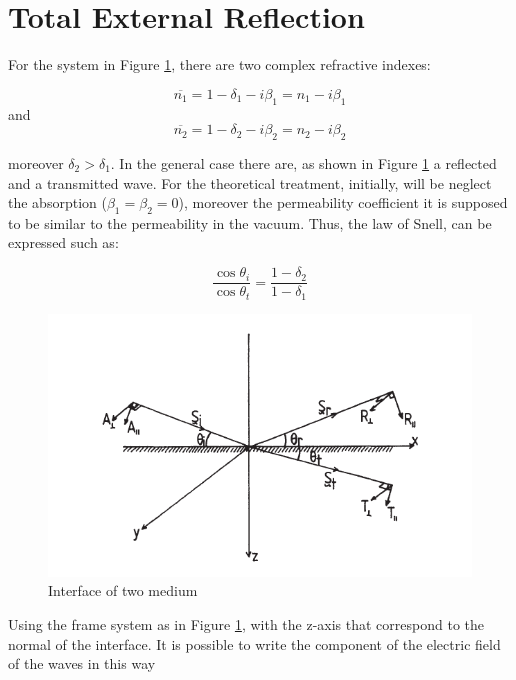 \section{Total External Reflection}
\label{sec: Total Externa Reflection}
\begin{flushleft}
For the system in Figure \ref{fig: System}, there are two complex refractive indexes:
\end{flushleft}
\begin{equation}
\overline{n_1} = 1 - \delta_1 - i \beta_1 = n_1 - i \beta_1
\label{eq: n1}
\end{equation}
and
\begin{equation}
\overline{n_2} = 1 - \delta_2 - i \beta_2 = n_2 - i \beta_2
\label{eq: n1}
\end{equation}
\begin{flushleft}
moreover $\delta_2 > \delta_1 $. In the general case there are, as shown in Figure \ref{fig: System} a reflected and a transmitted wave. For the theoretical treatment, initially, will be neglect the absorption ($\beta_1 = \beta_2 = 0$), moreover the permeability coefficient it is supposed to be similar to the permeability in the vacuum. Thus, the law of Snell, can be expressed such as: 
\end{flushleft}
\begin{equation}
\frac{\cos \theta_i}{\cos \theta_t} = \frac{1 - \delta_2}{1 - \delta_1}
\label{eq: snell 1}
\end{equation}
\begin{figure}[]
%
\centering
%
\includegraphics[width=.6\textwidth]{Immagini/Chapter1/System}
%
\caption{Interface of two medium}
%
\label{fig: System}
%
\end{figure}
\begin{flushleft}
Using the frame system as in Figure \ref{fig: System}, with the z-axis that correspond to the normal of the interface. It is possible to write the component of the electric field of the waves in this way
\end{flushleft}
